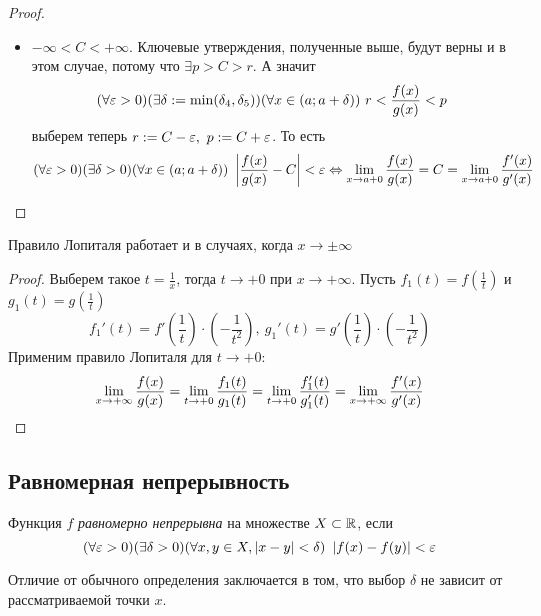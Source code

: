 \begin{proof}
\begin{itemize}
		\item $-\infty < C < +\infty$. Ключевые утверждения,
		полученные выше, будут верны и в этом случае,
		потому что $\exists p > C > r$. А значит
		\[
			(\forall \varepsilon > 0)(\exists \delta :=
			\min(\delta_4, \delta_5))(\forall x \in (a; a + \delta))
			\ r < \frac{f(x)}{g(x)} < p
		\]
		выберем теперь $r := C - \varepsilon,\ p := C + \varepsilon$. То есть
		\[
			(\forall \eps > 0)(\exists \delta > 0)
			(\forall x \in (a; a + \delta))\ 
			\left|\frac{f(x)}{g(x)} - C\right| < \eps
			\lra \liml_{x \to a + 0} \frac{f(x)}{g(x)} = C =
			\liml_{x \to a + 0} \frac{f'(x)}{g'(x)}
		\]
	\end{itemize}
\end{proof}

\begin{note}
	Правило Лопиталя работает и в случаях, когда $x \to \pm \infty$
\end{note}

\begin{proof}
	Выберем такое $t = \frac{1}{x}$, тогда $t \to +0$ при
	$x \to +\infty$. Пусть $f_1(t) = f(\frac{1}{t})$ и 
	$g_1(t) = g(\frac{1}{t})$
	\[
		f_1'(t) = f'\left(\frac{1}{t}\right) \cdot
		\left(-\frac{1}{t^2}\right),\ g_1'(t) = g'\left(\frac{1}{t}\right) \cdot
		\left(-\frac{1}{t^2}\right)
	\]
	Применим правило Лопиталя для $t \to +0$:
	\[
		\lim\limits_{x \to +\infty} \frac{f(x)}{g(x)} =
		\lim\limits_{t \to +0} \frac{f_1(t)}{g_1(t)} =
		\lim\limits_{t \to +0} \frac{f_1'(t)}{g_1'(t)} =
		\lim\limits_{x \to +\infty} \frac{f'(x)}{g'(x)}
	\]
\end{proof}

\subsection{Равномерная непрерывность}

\begin{definition}
	Функция $f$ \textit{равномерно непрерывна} на
	множестве $X \subset \mathbb{R}$, если
	\[
		(\forall \eps > 0)(\exists \delta > 0)
		(\forall x, y \in X, |x - y| < \delta)\ 
		\left|f(x) - f(y)\right| < \eps
	\]
\end{definition}

\begin{note}
	Отличие от обычного определения заключается в том,
	что выбор $\delta$ не зависит от рассматриваемой точки $x$.
\end{note}

